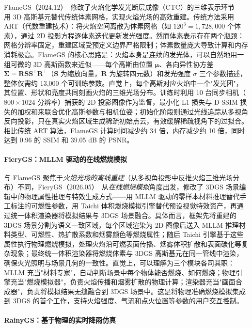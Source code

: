 FlameGS（2024.12）~\cite{2412_19841}修改了火焰化学发光断层成像（CTC）的三维表示环节——用 3D 高斯基元替代传统体素网格，实现火焰光场的高效重建。传统方法采用 ART（代数重建技术）：将火焰空间离散为体素网格（如 $120^3 = 1{,}728{,}000$ 个体素），通过 2D 投影方程逐体素迭代更新发光强度。然而体素表示存在两个瓶颈：网格分辨率固定，重建区域受预定义边界严格限制；体素数量庞大导致计算和内存消耗极高。FlameGS 的核心思路是：火焰本身是连续的发光体，可以自然地用一组可微的 3D 高斯函数来近似——每个高斯由位置 $\boldsymbol{\mu}$、各向异性协方差 $\boldsymbol{\Sigma} = \mathbf{R}\mathbf{S}\mathbf{S}^\top\mathbf{R}^\top$（$\mathbf{S}$ 为缩放向量，$\mathbf{R}$ 为旋转四元数）和发光强度 $\sigma$ 三个参数描述，整体仅需约 13{,}000 个可训练参数。直觉上，每个高斯对应火焰中一个"发光团"，其位置、形状和亮度共同刻画火焰的三维光场分布。训练时利用 10 台同步相机（$800 \times 1024$ 分辨率）捕获的 2D 投影图像作为监督，最小化 L1 损失与 D-SSIM 损失的加权和来联合优化高斯参数与相机位姿；初始化阶段则通过光线追踪从多视角反向投影，只在真实火焰区域生成稀疏初始点云，有效缓解稀疏视角下的过拟合。相比传统 ART 算法，FlameGS 计算时间减少约 34 倍，内存减少约 10 倍，同时达到 0.96 的 SSIM 和 39.05 dB 的 PSNR。

\paragraph{FieryGS：MLLM 驱动的在线燃烧模拟}

与 FlameGS 聚焦于\emph{火焰光场的离线重建}（从多视角投影中反推火焰三维光场分布）不同，FieryGS（2026.05）~\cite{2605_00177}从\emph{在线燃烧模拟}角度出发，修改了 3DGS 场景编辑中的物理属性推理与特效生成方式——用 MLLM 驱动的零样本材料推理替代手工标注的可燃性参数，用 Taichi 体积燃烧模拟引擎替代预设视觉特效资产，再通过统一体积渲染器将模拟结果与 3DGS 场景融合。具体而言，框架先将重建的 3DGS 场景分割为语义一致区域，每个区域渲染为 2D 图像后送入 MLLM 推理材料类型、可燃性、热扩散系数和烟雾颜色等燃烧属性；随后 Taichi 引擎基于这些属性执行物理燃烧模拟，处理火焰沿可燃表面传播、烟雾体积扩散和表面碳化等复杂现象；最终统一体积渲染器将燃烧体素与 3DGS 高斯基元在同一管线中渲染，确保火光照明与场景几何的一致性。直觉上，可以理解为三个模块各司其职：MLLM 充当"材料专家"，自动判断场景中每个物体能否燃烧、如何燃烧；物理引擎充当"燃烧模拟器"，负责火焰传播和烟雾扩散的物理计算；渲染器充当"画面合成器"，负责将模拟结果无缝融合到 3DGS 场景中。这是将物理准确燃烧模拟集成到 3DGS 的首个工作，支持火焰强度、气流和点火位置等参数的用户交互控制。

\paragraph{RainyGS：基于物理的实时降雨仿真}

